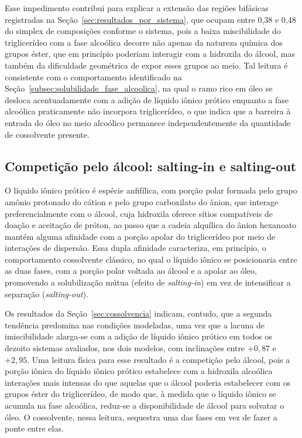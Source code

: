 Esse impedimento contribui para explicar a extensão das regiões bifásicas registradas na Seção~\ref{sec:resultados_por_sistema}, que ocupam entre 0,38 e 0,48 do simplex de composições conforme o sistema, pois a baixa miscibilidade do triglicerídeo com a fase alcoólica decorre não apenas da natureza química dos grupos éster, que em princípio poderiam interagir com a hidroxila do álcool, mas também da dificuldade geométrica de expor esses grupos ao meio. Tal leitura é consistente com o comportamento identificado na Seção~\ref{subsec:solubilidade_fase_alcoolica}, na qual o ramo rico em óleo se desloca acentuadamente com a adição de líquido iônico prótico enquanto a fase alcoólica praticamente não incorpora triglicerídeo, o que indica que a barreira à entrada do óleo no meio alcoólico permanece independentemente da quantidade de cossolvente presente.

\subsection{Competição pelo álcool: salting-in e salting-out}
\label{subsec:salting_in_out}

O líquido iônico prótico é espécie anfifílica, com porção polar formada pelo grupo amônio protonado do cátion e pelo grupo carboxilato do ânion, que interage preferencialmente com o álcool, cuja hidroxila oferece sítios compatíveis de doação e aceitação de próton, ao passo que a cadeia alquílica do ânion hexanoato mantém alguma afinidade com a porção apolar do triglicerídeo por meio de interações de dispersão. Essa dupla afinidade caracteriza, em princípio, o comportamento cossolvente clássico, no qual o líquido iônico se posicionaria entre as duas fases, com a porção polar voltada ao álcool e a apolar ao óleo, promovendo a solubilização mútua (efeito de \textit{salting-in}) em vez de intensificar a separação (\textit{salting-out}).

Os resultados da Seção~\ref{sec:cossolvencia} indicam, contudo, que a segunda tendência predomina nas condições modeladas, uma vez que a lacuna de imiscibilidade alarga-se com a adição de líquido iônico prótico em todos os dezoito sistemas avaliados, nos dois modelos, com inclinações entre $+0{,}87$ e $+2{,}95$. Uma leitura física para esse resultado é a competição pelo álcool, pois a porção iônica do líquido iônico prótico estabelece com a hidroxila alcoólica interações mais intensas do que aquelas que o álcool poderia estabelecer com os grupos éster do triglicerídeo, de modo que, à medida que o líquido iônico se acumula na fase alcoólica, reduz-se a disponibilidade de álcool para solvatar o óleo. O cossolvente, nessa leitura, sequestra uma das fases em vez de fazer a ponte entre elas.

